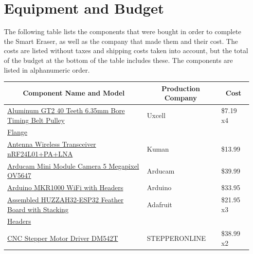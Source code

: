 \section{Equipment and Budget}
The following table lists the components that were bought in order to complete the Smart Eraser, as well as the company that made them and their cost. The costs are listed without taxes and shipping costs taken into account, but the total of the budget at the bottom of the table includes these. The components are listed in alphanumeric order.
\setlength{\parindent}{5ex}
\begin{table} [H]
	\normalsize
	\centering
	\begin{tabular}{|l|l|l|}
		\hline
		\multicolumn{1}{|c|}{\textbf{Component Name and Model}}  & 
		\multicolumn{1}{|c|}{\textbf{Production Company}}  & 
		\multicolumn{1}{|c|}{\textbf{Cost}} \\
		\hline
		\href{https://www.amazon.com/dp/B0728PDWY5/?coliid=I3K7SWFRMQ3A2F\&colid=22YAOKWOJAKA9\&psc=0\&ref_=lv_ov_lig_dp_it}{Aluminum GT2 40 Teeth 6.35mm Bore Timing Belt Pulley} 	& Uxcell 		& \$7.19 x4 \\
		\href{https://www.amazon.com/dp/B0728PDWY5/?coliid=I3K7SWFRMQ3A2F\&colid=22YAOKWOJAKA9\&psc=0\&ref_=lv_ov_lig_dp_it}{Flange} 	& 		& \\
		\hline
		\href{https://www.amazon.com/dp/B06VSYJ7HN/?coliid=I2N6U5HO8N5E5L\&colid=22YAOKWOJAKA9\&psc=0\&ref_=lv_ov_lig_dp_it}{Antenna Wireless Transceiver nRF24L01+PA+LNA} 	& Kuman 		& \$13.99 \\
		\hline
		\href{https://www.amazon.com/Arducam-Module-Camera-Arduino-Mega2560/dp/B013JUKZ48/ref=sr_1_fkmrnull_2_sspa?keywords=Arducam+Mini+Module+Camera+5+Megapixel+OV5647\&qid=1555715678\&s=gateway\&sr=8-2-fkmrnull-spons\&psc=1}{Arducam Mini Module Camera 5 Megapixel OV5647} 	& Arducam 		& \$39.99 \\
		\hline
		\href{https://store.arduino.cc/usa/arduino-mkr1000}{Arduino MKR1000 WiFi with Headers} 	& Arduino 		& \$33.95 \\
		\hline
		\href{https://www.adafruit.com/product/3619}{Assembled HUZZAH32-ESP32 Feather Board with Stacking} 	& Adafruit 		& \$21.95 x3 \\
		\href{https://www.adafruit.com/product/3619}{Headers} 	&  		&  \\
		\hline
		\href{https://www.amazon.com/dp/B06Y5VPSFN/?coliid=I1R941FDJ72L0R\&colid=22YAOKWOJAKA9\&psc=0\&ref_=lv_ov_lig_dp_it}{CNC Stepper Motor Driver DM542T} 	& STEPPERONLINE 		& \$38.99 x2 \\

\end{tabular}
\end{table}
